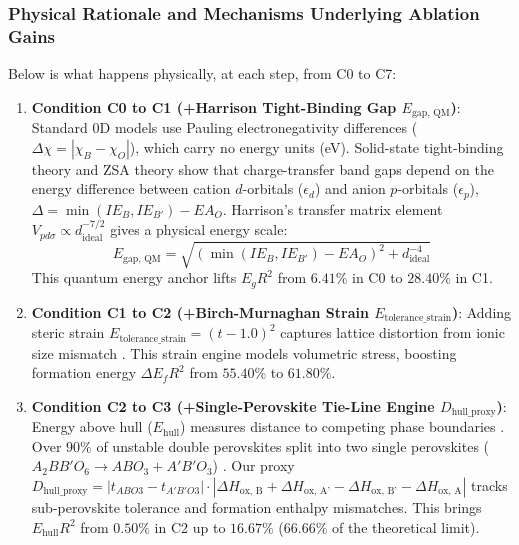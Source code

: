 \documentclass[12pt,onecolumn]{elsarticle}
\begin{document}
\subsubsection{Physical Rationale and Mechanisms Underlying Ablation Gains}
Below is what happens physically, at each step, from C0 to C7:

\begin{enumerate}
\item \textbf{Condition C0 to C1 (+Harrison Tight-Binding Gap $E_{\text{gap, QM}}$)}: Standard 0D models use Pauling electronegativity differences ($\Delta\chi = |\chi_B - \chi_O|$), which carry no energy units (eV). Solid-state tight-binding theory \cite{harrison1999elementary} and ZSA theory \cite{zaanen1985band} show that charge-transfer band gaps depend on the energy difference between cation $d$-orbitals ($\epsilon_d$) and anion $p$-orbitals ($\epsilon_p$), $\Delta = \min(IE_B, IE_{B'}) - EA_O$. Harrison's transfer matrix element $V_{pd\sigma} \propto d_{\text{ideal}}^{-7/2}$ gives a physical energy scale:
\begin{equation}
E_{\text{gap, QM}} = \sqrt{\left(\min(IE_B, IE_{B'}) - EA_O\right)^2 + d_{\text{ideal}}^{-4}}
\end{equation}
This quantum energy anchor lifts $E_g R^2$ from $6.41\%$ in C0 to \textbf{$28.40\%$} in C1.

\item \textbf{Condition C1 to C2 (+Birch-Murnaghan Strain $E_{\text{tolerance\_strain}}$)}: Adding steric strain $E_{\text{tolerance\_strain}} = (t - 1.0)^2$ captures lattice distortion from ionic size mismatch \cite{goldschmidt1926gesetze, woodward1997octahedral}. This strain engine models volumetric stress, boosting formation energy $\Delta E_f R^2$ from $55.40\%$ to \textbf{$61.80\%$}.

\item \textbf{Condition C2 to C3 (+Single-Perovskite Tie-Line Engine $D_{\text{hull\_proxy}}$)}: Energy above hull ($E_{\text{hull}}$) measures distance to competing phase boundaries \cite{sun2016thermodynamic}. Over $90\%$ of unstable double perovskites split into two single perovskites ($A_2BB'O_6 \rightarrow ABO_3 + A'B'O_3$) \cite{yamashita2018band}. Our proxy $D_{\text{hull\_proxy}} = |t_{ABO3} - t_{A'B'O3}| \cdot |\Delta H_{\text{ox, B}} + \Delta H_{\text{ox, A'}} - \Delta H_{\text{ox, B'}} - \Delta H_{\text{ox, A}}|$ tracks sub-perovskite tolerance and formation enthalpy mismatches. This brings $E_{\text{hull}} R^2$ from $0.50\%$ in C2 up to \textbf{$16.67\%$} ($66.66\%$ of the theoretical limit).


\end{enumerate}
\end{document}
